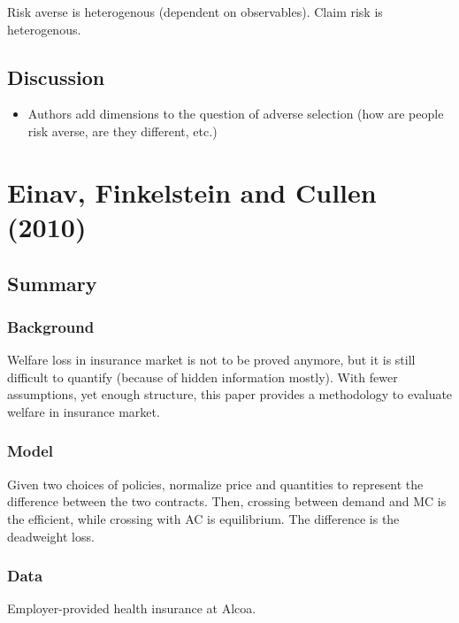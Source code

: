 Risk averse is heterogenous (dependent on observables). Claim risk is heterogenous.

\subsection{Discussion}

\begin{itemize}
\item Authors add dimensions to the question of adverse selection (how are people risk averse, are they different, etc.)
\end{itemize}

\section{Einav, Finkelstein and Cullen (2010)}

\subsection{Summary}

\subsubsection{Background}

Welfare loss in insurance market is not to be proved anymore, but it is still difficult to quantify (because of hidden information mostly). With fewer assumptions, yet enough structure, this paper provides a methodology to evaluate welfare in insurance market.

\subsubsection{Model}

Given two choices of policies, normalize price and quantities to represent the difference between the two contracts. Then, crossing between demand and MC is the efficient, while crossing with AC is equilibrium. The difference is the deadweight loss.

\subsubsection{Data}

Employer-provided health insurance at Alcoa.